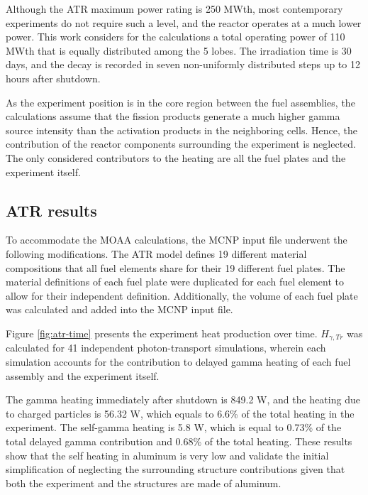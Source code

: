 \documentclass{style/nseJournal}
\begin{document}
Although the ATR maximum power rating is 250 MWth, most contemporary experiments do not require such a level, and the reactor operates at a much lower power.
This work considers for the calculations a total operating power of 110 MWth that is equally distributed among the 5 lobes.
The irradiation time is 30 days, and the decay is recorded in seven non-uniformly distributed steps up to 12 hours after shutdown.

As the experiment position is in the core region between the fuel assemblies, the calculations assume that the fission products generate a much higher gamma source intensity than the activation products in the neighboring cells.
Hence, the contribution of the reactor components surrounding the experiment is neglected.
The only considered contributors to the heating are all the fuel plates and the experiment itself.


\subsection{ATR results}

To accommodate the MOAA calculations, the MCNP input file underwent the following modifications.
The ATR model defines 19 different material compositions that all fuel elements share for their 19 different fuel plates.
The material definitions of each fuel plate were duplicated for each fuel element to allow for their independent definition.
Additionally, the volume of each fuel plate was calculated and added into the MCNP input file.

Figure \ref{fig:atr-time} presents the experiment heat production over time.
$H_{\gamma,Tr}$ was calculated for 41 independent photon-transport simulations, wherein each simulation accounts for the contribution to delayed gamma heating of each fuel assembly and the experiment itself.

The gamma heating immediately after shutdown is 849.2 W, and the heating due to charged particles is 56.32 W, which equals to 6.6\% of the total heating in the experiment.
The self-gamma heating is 5.8 W, which is equal to 0.73\% of the total delayed gamma contribution and 0.68\% of the total heating.
These results show that the self heating in aluminum is very low and validate the initial simplification of neglecting the surrounding structure contributions given that both the experiment and the structures are made of aluminum.
\end{document}
